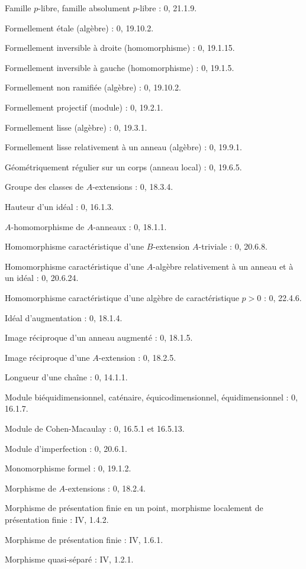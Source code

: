 \documentclass[10pt,oneside]{book}
\begin{document}
Famille $p$-libre, famille absolument $p$-libre : 0, 21.1.9.\par
Formellement étale (algèbre) : 0, 19.10.2.\par
Formellement inversible à droite (homomorphisme) : 0, 19.1.15.\par
Formellement inversible à gauche (homomorphisme) : 0, 19.1.5.\par
Formellement non ramifiée (algèbre) : 0, 19.10.2.\par
Formellement projectif (module) : 0, 19.2.1.\par
Formellement lisse (algèbre) : 0, 19.3.1.\par
Formellement lisse relativement à un anneau (algèbre) : 0, 19.9.1.\par

Géométriquement régulier sur un corps (anneau local) : 0, 19.6.5.\par
Groupe des classes de $A$-extensions : 0, 18.3.4.\par

Hauteur d'un idéal : 0, 16.1.3.\par
$A$-homomorphisme de $A$-anneaux : 0, 18.1.1.\par
Homomorphisme caractéristique d'une $B$-extension $A$-triviale : 0, 20.6.8.\par
Homomorphisme caractéristique d'une $A$-algèbre relativement à un anneau et à un idéal : 0, 20.6.24.\par
Homomorphisme caractéristique d'une algèbre de caractéristique $p>0$ : 0, 22.4.6.\par

Idéal d'augmentation : 0, 18.1.4.\par
Image réciproque d'un anneau augmenté : 0, 18.1.5.\par
Image réciproque d'une $A$-extension : 0, 18.2.5.\par

Longueur d'une chaîne : 0, 14.1.1.\par

Module biéquidimensionnel, caténaire, équicodimensionnel, équidimensionnel : 0, 16.1.7.\par
Module de Cohen-Macaulay : 0, 16.5.1 et 16.5.13.\par
Module d'imperfection : 0, 20.6.1.\par
Monomorphisme formel : 0, 19.1.2.\par
Morphisme de $A$-extensions : 0, 18.2.4.\par
Morphisme de présentation finie en un point, morphisme localement de présentation finie : IV, 1.4.2.\par
Morphisme de présentation finie : IV, 1.6.1.\par
Morphisme quasi-séparé : IV, 1.2.1.\par
\end{document}
